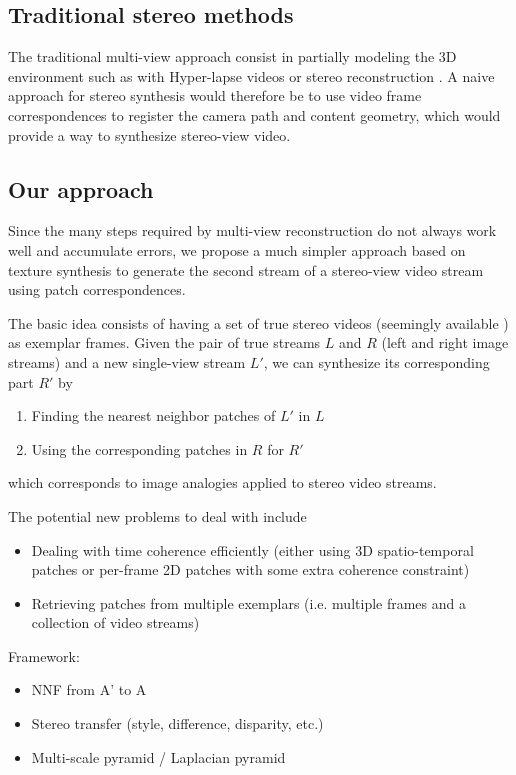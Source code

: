\subsection{Traditional stereo methods}

The traditional multi-view approach consist in partially modeling the 3D environment such as with Hyper-lapse videos \cite{Kopf14} or stereo reconstruction \cite{Seitz06}. A naive approach for stereo synthesis would therefore be to use video frame correspondences to register the camera path and content geometry, which would provide a way to synthesize stereo-view video.

\subsection{Our approach}

Since the many steps required by multi-view reconstruction do not always work well and accumulate errors, we propose a much simpler approach based on texture synthesis to generate the second stream of a stereo-view video stream using patch correspondences.

The basic idea consists of having a set of true stereo videos (seemingly available \cite{Corrigan10, Smolic10}) as exemplar frames.
Given the pair of true streams $L$ and $R$ (left and right image streams) and a new single-view stream $L'$, we can synthesize its corresponding part $R'$ by
\begin{enumerate}
	\setlength{\itemsep}{4pt}
  \setlength{\parskip}{0pt}
  \setlength{\parsep}{0pt}
	\item Finding the nearest neighbor patches of $L'$ in $L$
	\item Using the corresponding patches in $R$ for $R'$
\end{enumerate}
which corresponds to image analogies \cite{Efros01, Hertzmann01} applied to stereo video streams.

The potential new problems to deal with include
\begin{itemize}
	\setlength{\itemsep}{4pt}
  \setlength{\parskip}{0pt}
  \setlength{\parsep}{0pt}
	\item Dealing with time coherence efficiently (either using 3D spatio-temporal patches or per-frame 2D patches with some extra coherence constraint)
	\item Retrieving patches from multiple exemplars \cite{Barnes11, Hu13} (i.e. multiple frames and a collection of video streams)
\end{itemize}

Framework:
\begin{itemize}
	\item NNF from A' to A
	\item Stereo transfer (style, difference, disparity, etc.)
	\item Multi-scale pyramid / Laplacian pyramid
\end{itemize}